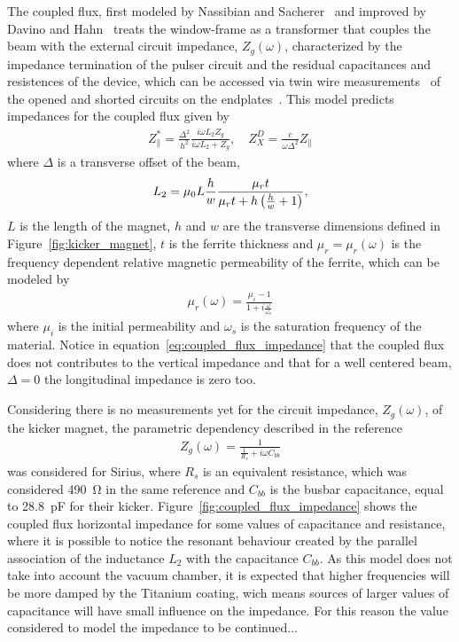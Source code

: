     The coupled flux, first modeled by Nassibian and Sacherer~\cite{Nassibian1979} and improved by Davino and Hahn~\cite{Davino2003} treats the window-frame as a transformer that couples the beam with the external circuit impedance, $Z_g(\omega)$, characterized by the impedance termination of the pulser circuit and the residual capacitances and resistences of the device, which can be accessed via twin wire measurements~\cite{Caspershandbook} of the opened and shorted circuits on the endplates~\cite{Davino2003}. This model predicts impedances for the coupled flux given by
    \begin{align}\label{eq:coupled_flux_impedance}
        Z_\parallel^* = \frac{\Delta^2}{h^2}\frac{i\omega L_2 Z_g}{i\omega L_2 + Z_g},
        \quad Z_X^D = \frac{c}{\omega\Delta^2}Z_\parallel
    \end{align}
    where $\Delta$ is a transverse offset of the beam,
    \begin{align}
        L_2 = \mu_0L\frac{h}{w}\frac{\mu_rt}{\mu_rt+h\left(\frac{h}{w}+1\right)},
    \end{align}
    $L$ is the length of the magnet, $h$ and $w$ are the transverse dimensions defined in Figure~\ref{fig:kicker_magnet}, $t$ is the ferrite thickness and $\mu_r = \mu_r(\omega)$ is the frequency dependent relative magnetic permeability of the ferrite, which can be modeled by
    \begin{align}
        \mu_r(\omega) = \frac{\mu_i-1}{1+i\frac{\omega}{\omega_s}}
    \end{align}
    where $\mu_i$ is the initial permeability and $\omega_s$ is the saturation frequency of the material. Notice in equation~\ref{eq:coupled_flux_impedance} that the coupled flux does not contributes to the vertical impedance and that for a well centered beam, $\Delta=0$ the longitudinal impedance is zero too.

    Considering there is no measurements yet for the circuit impedance, $Z_g(\omega)$, of the kicker magnet, the parametric dependency described in the reference~\cite[eq. 11]{Davino2003}
    \begin{align}
        Z_g(\omega) = \frac{1}{\frac{1}{R_s}+i\omega C_{bb}}
    \end{align}
    was considered for Sirius, where $R_s$ is an equivalent resistance, which was considered \SI{490}{\ohm} in the same reference and $C_{bb}$ is the busbar capacitance, equal to \SI{28.8}{\pico\farad} for their kicker. Figure~\ref{fig:coupled_flux_impedance} shows the coupled flux horizontal impedance for some values of capacitance and resistance, where it is possible to notice the resonant behaviour created by the parallel association of the inductance $L_2$ with the capacitance $C_{bb}$. As this model does not take into account the vacuum chamber, it is expected that higher frequencies will be more damped by the Titanium coating, wich means sources of larger values of capacitance will have small influence on the impedance. For this reason the value considered to model the impedance {\huge to be continued...}

